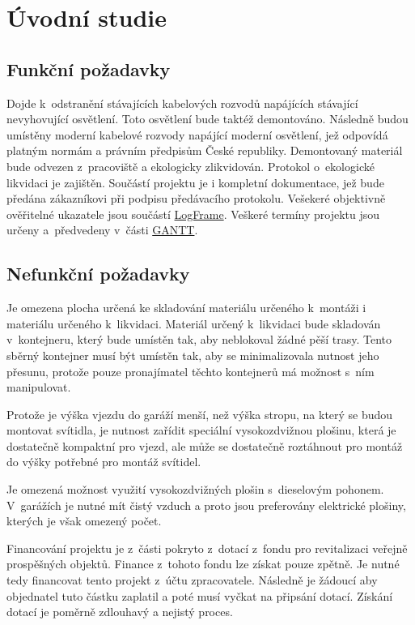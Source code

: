 \documentclass[a4paper, twoside, 11pt]{article}
\begin{document}
	
\section{Úvodní studie}
	\subsection{Funkční požadavky}
		Dojde k~odstranění stávajících kabelových rozvodů napájících stávající nevyhovující osvětlení. Toto osvětlení bude taktéž demontováno. Následně budou umístěny moderní kabelové rozvody napájící moderní osvětlení, jež odpovídá platným normám a právním předpisům České republiky. Demontovaný materiál bude odvezen z~pracoviště a ekologicky zlikvidován. Protokol o~ekologické likvidaci je zajištěn. Součástí projektu je i kompletní dokumentace, jež bude předána zákazníkovi při podpisu předávacího protokolu. Vešekeré objektivně ověřitelné ukazatele jsou součástí \hyperref[sec:logframe]{LogFrame}. Veškeré termíny projektu jsou určeny a~předvedeny v~části \hyperref[sec:gantt]{GANTT}.
	\subsection{Nefunkční požadavky}
		Je omezena plocha určená ke skladování materiálu určeného k~montáži i materiálu určeného k~likvidaci. Materiál určený k~likvidaci bude skladován v~kontejneru, který bude umístěn tak, aby neblokoval žádné pěší trasy. Tento sběrný kontejner musí být umístěn tak, aby se minimalizovala nutnost jeho přesunu, protože pouze pronajímatel těchto kontejnerů má možnost s~ním manipulovat.\par
		Protože je výška vjezdu do garáží menší, než výška stropu, na který se budou montovat svítidla, je nutnost zařídit speciální vysokozdvižnou plošinu, která je dostatečně kompaktní pro vjezd, ale může se dostatečně roztáhnout pro montáž do výšky potřebné pro montáž svítidel.\par
		Je omezená možnost využití vysokozdvižných plošin s~dieselovým pohonem. V~garážích je nutné mít čistý vzduch a proto jsou preferovány elektrické plošiny, kterých je však omezený počet.\par
		Financování projektu je z~části pokryto z~dotací z~fondu pro revitalizaci veřejně prospěšných objektů. Finance z~tohoto fondu lze získat pouze zpětně. Je nutné tedy financovat tento projekt z~účtu zpracovatele. Následně je žádoucí aby objednatel tuto částku zaplatil a poté musí vyčkat na připsání dotací. Získání dotací je poměrně zdlouhavý a nejistý proces. \par
		
\end{document}
